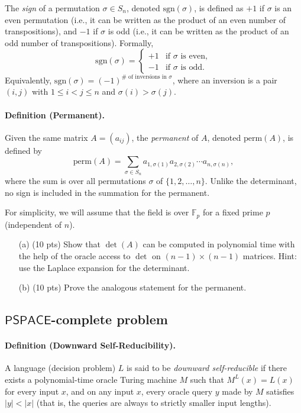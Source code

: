 \documentclass[12pt]{article}
\begin{document}
The \emph{sign} of a permutation $\sigma \in S_n$, denoted $\mathrm{sgn}(\sigma)$, is defined as $+1$ if $\sigma$ is an even permutation (i.e., it can be written as the product of an even number of transpositions), and $-1$ if $\sigma$ is odd (i.e., it can be written as the product of an odd number of transpositions). Formally,
\[
    \mathrm{sgn}(\sigma) =
    \begin{cases}
        +1 &\text{if $\sigma$ is even},\\
        -1 &\text{if $\sigma$ is odd.}
    \end{cases}
\]
Equivalently, $\mathrm{sgn}(\sigma) = (-1)^{\# \text{ of inversions in } \sigma}$, where an inversion is a pair $(i, j)$ with $1 \leq i < j \leq n$ and $\sigma(i) > \sigma(j)$.


\paragraph{Definition (Permanent).} 
Given the same matrix $A = (a_{ij})$, the \emph{permanent} of $A$, denoted $\mathrm{perm}(A)$, is defined by
\[
    \mathrm{perm}(A) = \sum_{\sigma \in S_n} a_{1,\sigma(1)} a_{2,\sigma(2)} \cdots a_{n,\sigma(n)},
\]
where the sum is over all permutations $\sigma$ of $\{1,2,\ldots,n\}$. Unlike the determinant, no sign is included in the summation for the permanent.

For simplicity, we will assume that the field is over $\mathbb{F}_{p}$ for a fixed prime $p$ (independent of $n$).

\begin{enumerate}
    \item[(a)] (10 pts) Show that $\det(A)$ can be computed in polynomial time with the help of the oracle access to $\det$ on $(n-1)\times(n-1)$ matrices. Hint: use the Laplace expansion for the determinant.

    \item[(b)] (10 pts) Prove the analogous statement for the permanent. 
\end{enumerate}

\newcommand{\PSPACE}{\textsf{PSPACE}}

\subsection{$\PSPACE$-complete problem}

\paragraph{Definition (Downward Self-Reducibility).}
A language (decision problem) $L$ is said to be \emph{downward self-reducible} if there exists a polynomial-time oracle Turing machine $M$ such that $M^L(x) = L(x)$ for every input $x$, and on any input $x$, every oracle query $y$ made by $M$ satisfies $|y| < |x|$ (that is, the queries are always to strictly smaller input lengths). 
\end{document}
